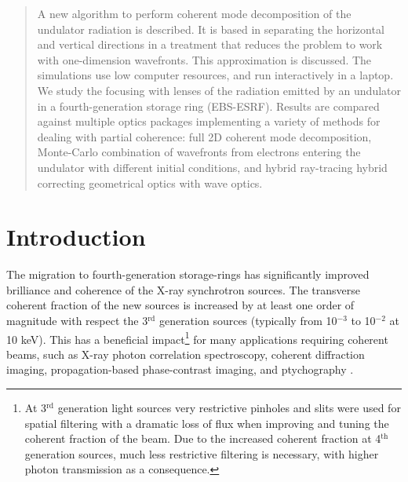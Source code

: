 \documentclass{iucr}              %
\newcommand{\inred}[1]{{\color{red}#1}}
\begin{document}
\begin{abstract}

A new algorithm to perform coherent mode decomposition of the undulator radiation is described. 
It is based in separating the horizontal and vertical directions in a treatment that reduces the problem to work with one-dimension wavefronts.
This approximation is discussed. The simulations use low computer resources, and run interactively in a laptop. 
We study the focusing with lenses of the radiation emitted by an undulator in a fourth-generation storage ring (EBS-ESRF).
Results are compared against multiple optics packages implementing a variety of methods for dealing with partial coherence: full 2D coherent mode decomposition, Monte-Carlo combination of wavefronts from electrons entering the undulator with different initial conditions, and hybrid ray-tracing hybrid correcting geometrical optics with wave optics. 

\end{abstract}

\section{Introduction}
\label{sec:introduction}

The migration to fourth-generation storage-rings has significantly improved brilliance and coherence of the X-ray synchrotron sources. The transverse coherent fraction of the new sources is increased by at least one order of magnitude with respect the 3$^{\text{rd}}$ generation sources (typically from 10$^{-3}$ to 10$^{-2}$ at 10 keV). This has a beneficial impact\footnote{At 3$^{\text{rd}}$ generation light sources very restrictive pinholes and slits were used for spatial filtering with a dramatic loss of flux when improving and tuning the coherent fraction of the beam. Due to the increased coherent fraction at 4$^{\text{th}}$ generation sources, much less restrictive filtering is necessary, with higher photon transmission as a consequence.} for many applications requiring coherent beams, such as X-ray photon correlation spectroscopy, coherent diffraction imaging, propagation-based phase-contrast imaging, and ptychography \cite{paganin_book}.
\end{document}
